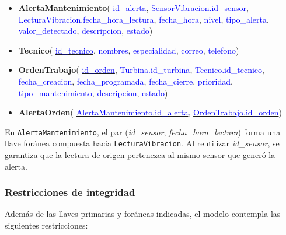\documentclass[11pt,a4paper]{article}
\begin{document}
\begin{itemize}
    \item \textbf{\textcolor{green!50!black}{AlertaMantenimiento}}(
    \underline{\textcolor{blue}{id\_alerta}},
    \textcolor{blue}{SensorVibracion.id\_sensor},
    \textcolor{blue}{LecturaVibracion.fecha\_hora\_lectura},
    \textcolor{blue}{fecha\_hora},
    \textcolor{blue}{nivel},
    \textcolor{blue}{tipo\_alerta},
    \textcolor{blue}{valor\_detectado},
    \textcolor{blue}{descripcion},
    \textcolor{blue}{estado})

    \item \textbf{\textcolor{green!50!black}{Tecnico}}(
    \underline{\textcolor{blue}{id\_tecnico}},
    \textcolor{blue}{nombres},
    \textcolor{blue}{especialidad},
    \textcolor{blue}{correo},
    \textcolor{blue}{telefono})

    \item \textbf{\textcolor{green!50!black}{OrdenTrabajo}}(
    \underline{\textcolor{blue}{id\_orden}},
    \textcolor{blue}{Turbina.id\_turbina},
    \textcolor{blue}{Tecnico.id\_tecnico},
    \textcolor{blue}{fecha\_creacion},
    \textcolor{blue}{fecha\_programada},
    \textcolor{blue}{fecha\_cierre},
    \textcolor{blue}{prioridad},
    \textcolor{blue}{tipo\_mantenimiento},
    \textcolor{blue}{descripcion},
    \textcolor{blue}{estado})

    \item \textbf{\textcolor{green!50!black}{AlertaOrden}}(
    \underline{\textcolor{blue}{AlertaMantenimiento.id\_alerta}},
    \underline{\textcolor{blue}{OrdenTrabajo.id\_orden}})

\end{itemize}

En \texttt{AlertaMantenimiento}, el par (\textit{id\_sensor},
\textit{fecha\_hora\_lectura}) forma una llave foránea compuesta hacia
\texttt{LecturaVibracion}. Al reutilizar \textit{id\_sensor}, se garantiza que la
lectura de origen pertenezca al mismo sensor que generó la alerta.

\subsubsection{Restricciones de integridad}

Además de las llaves primarias y foráneas indicadas, el modelo contempla las
siguientes restricciones:
\end{document}
